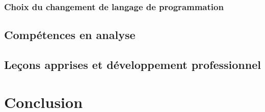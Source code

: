 \documentclass[a4paper, 12pt, french]{article}
\begin{document}
				\subsubsection{Choix du changement de langage de programmation}
			
			\subsection{Compétences en analyse}
						
			
			\subsection{Leçons apprises et développement professionnel}
			
			
	
	\section{Conclusion}

	\newpage
	

	\renewcommand\refname{Bibliographie}
	
\end{document}
